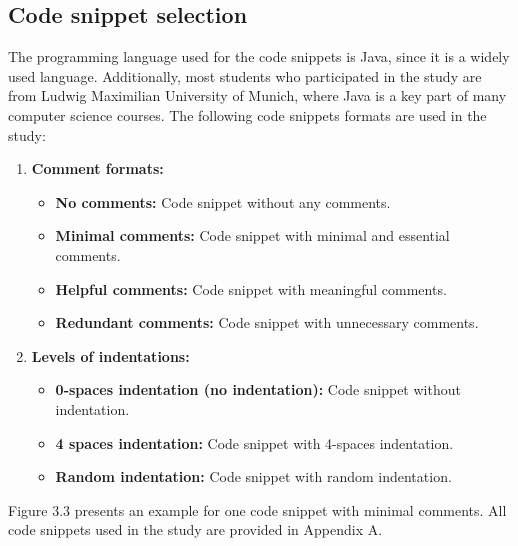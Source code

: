 \subsection{Code snippet selection}

The programming language used for the code snippets is Java, since it is a widely used language.  Additionally, most students who participated in the study are from Ludwig Maximilian University of Munich, where Java is a key part of many computer science courses. The following code snippets formats are used in the study:



\begin{enumerate}
    \item \textbf{Comment formats:}
    \begin{itemize}
        \item \textbf{No comments:} Code snippet without any comments.
        \item \textbf{Minimal comments:} Code snippet with minimal and essential comments.
        \item \textbf{Helpful comments:} Code snippet with meaningful comments.
        \item \textbf{Redundant comments:} Code snippet with unnecessary comments.
    \end{itemize}
    
    \item \textbf{Levels of indentations:}
    \begin{itemize}
        \item \textbf{0-spaces indentation (no indentation):} Code snippet without indentation.
        \item \textbf{4 spaces indentation:} Code snippet with 4-spaces indentation.
        \item \textbf{Random indentation:} Code snippet with random indentation.
    \end{itemize}
\end{enumerate}

Figure 3.3  presents an example for one code snippet with minimal comments. All code snippets used in the study are provided in Appendix A.


